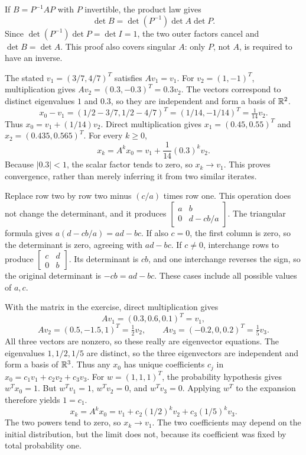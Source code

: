If $B=P^{-1}AP$ with $P$ invertible, the product law gives
\[
 \det B=\det(P^{-1})\det A\det P.
\]
Since $\det(P^{-1})\det P=\det I=1$, the two outer factors
cancel and $\det B=\det A$. This proof also covers singular $A$:
only $P$, not $A$, is required to have an inverse.

The stated $v_1=(3/7,4/7)^T$ satisfies $Av_1=v_1$.
For $v_2=(1,-1)^T$, multiplication gives
$Av_2=(0.3,-0.3)^T=0.3v_2$. The vectors correspond to distinct
eigenvalues $1$ and $0.3$, so they are independent and form a basis of $\mathbb{R}^2$.
\[
 x_0-v_1=(1/2-3/7,1/2-4/7)^T=(1/14,-1/14)^T=\tfrac1{14}v_2.
\]
Thus $x_0=v_1+(1/14)v_2$.
Direct multiplication gives $x_1=(0.45,0.55)^T$ and
$x_2=(0.435,0.565)^T$. For every $k\ge0$,
\[
 x_k=A^kx_0=v_1+\frac1{14}(0.3)^kv_2.
\]
Because $|0.3|<1$, the scalar factor tends to zero, so $x_k\to v_1$.
This proves convergence, rather than merely inferring it from two similar iterates.

Replace row two by row two minus $(c/a)$ times row one. This operation
does not change the determinant, and it produces
$\begin{bmatrix}a&b\\0&d-cb/a\end{bmatrix}$.
The triangular formula gives $a(d-cb/a)=ad-bc$.
If also $c=0$, the first column is zero, so the determinant is zero,
agreeing with $ad-bc$. If $c\ne0$, interchange rows to produce
$\begin{bmatrix}c&d\\0&b\end{bmatrix}$. Its determinant is $cb$,
and one interchange reverses the sign, so the original determinant
is $-cb=ad-bc$. These cases include all possible values of $a,c$.

With the matrix in the exercise, direct multiplication gives
\[
 Av_1=(0.3,0.6,0.1)^T=v_1,
\]
\[
 Av_2=(0.5,-1.5,1)^T=\tfrac12v_2,\qquad
 Av_3=(-0.2,0,0.2)^T=\tfrac15v_3.
\]
All three vectors are nonzero, so these really are eigenvector equations.
The eigenvalues $1,1/2,1/5$ are distinct, so the three eigenvectors
are independent and form a basis of $\mathbb{R}^3$. Thus any $x_0$ has
unique coefficients $c_j$ in $x_0=c_1v_1+c_2v_2+c_3v_3$.
For $w=(1,1,1)^T$, the probability hypothesis gives $w^Tx_0=1$.
But $w^Tv_1=1$, $w^Tv_2=0$, and $w^Tv_3=0$. Applying
$w^T$ to the expansion therefore yields $1=c_1$.
\[
 x_k=A^kx_0=v_1+c_2(1/2)^kv_2+c_3(1/5)^kv_3.
\]
The two powers tend to zero, so $x_k\to v_1$.
The two coefficients may depend on the initial distribution, but the
limit does not, because its coefficient was fixed by total probability one.

